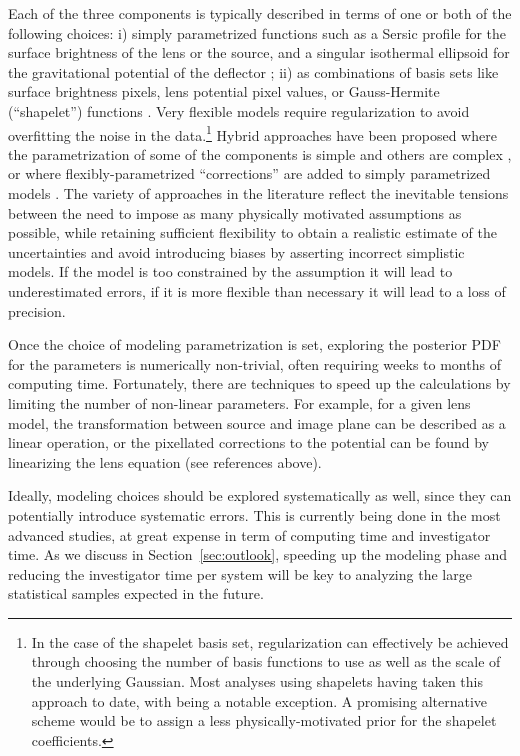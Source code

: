 Each of the three components is typically described in terms of one or
both of the following choices:
i) simply parametrized functions such as a Sersic profile
for the surface brightness of the lens or the source, and a singular
isothermal ellipsoid for the gravitational potential of the deflector
\citep[e.g.][]{Mar++07,Kne++11,Kee11}; ii) as combinations of basis sets like surface brightness
pixels, lens potential pixel values, or Gauss-Hermite (``shapelet'')
functions
\citep[e.g.][]{Col08, BirrerEtal2015, Nig++15, TagoreAndJackson2016}.
Very flexible models require regularization to avoid overfitting the
noise in the data.\footnote{In the case of the shapelet basis set,
regularization can effectively be achieved through choosing the number of basis
functions to use as well as the scale of the underlying Gaussian. Most
analyses using shapelets having taken this approach to date, with
\citet{TagoreAndJackson2016} being a notable exception. A
promising alternative scheme would be to assign a less physically-motivated prior for the
shapelet coefficients.}
Hybrid approaches have been proposed where the parametrization of some of
the components is simple and others are complex
\citep{W+D03,T+K04,BrewerAndLewis2006,Suy++06,S+H10}, or where flexibly-parametrized
``corrections'' are added to simply parametrized models
\citep{Koo05,V+K09a,Suy++09,BirrerEtal2015}.  The variety of approaches
in the literature reflect the inevitable tensions between the need to
impose as many physically motivated assumptions as possible, while
retaining sufficient flexibility to obtain a realistic estimate of the
uncertainties and avoid introducing biases by asserting incorrect
simplistic models. If the model is too constrained by the assumption
it will lead to underestimated errors, if it is more flexible than
necessary it will lead to a loss of precision.

Once the choice of modeling parametrization is set, exploring the
posterior PDF for the parameters is numerically non-trivial, often requiring weeks to months
of computing time. Fortunately, there are techniques to speed up the
calculations by limiting the number of non-linear parameters. For
example, for a given lens model, the transformation between source and
image plane can be described as a linear operation, or the pixellated
corrections to the potential can be found by linearizing the lens
equation (see references above).

Ideally, modeling choices should be explored systematically as well,
since they can potentially introduce systematic errors. This is
currently being done in the most advanced studies, at great expense in
term of computing time and investigator time. As we discuss in
Section~\ref{sec:outlook}, speeding up the modeling phase and reducing
the investigator time per system will be key to analyzing the large
statistical samples expected in the future.

